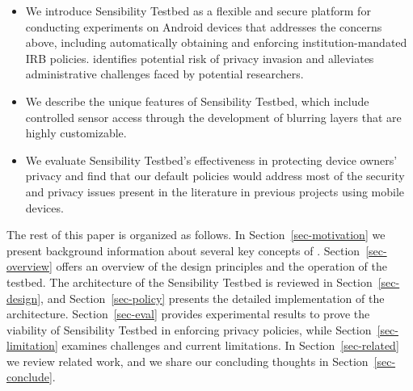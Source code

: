 \begin{itemize}\setlength\itemsep{0em}

\item We introduce Sensibility Testbed as a flexible and secure platform for
conducting experiments on Android devices that addresses the
concerns above, including automatically obtaining and enforcing 
institution-mandated IRB policies. \sysname identifies potential 
risk of privacy invasion and alleviates administrative 
challenges faced by potential researchers.

\item We describe the unique features of Sensibility Testbed, which include 
controlled sensor access through the development of blurring layers that are
highly customizable.

\item We evaluate Sensibility Testbed's effectiveness in
protecting device owners' privacy and find that our default 
policies would address most of the 
security and privacy issues present in the literature in 
previous projects using mobile devices.
\end{itemize}

The rest of this paper is organized as follows. In Section~\ref{sec-motivation} we
present background information about several key concepts of \sysname. 
Section~\ref{sec-overview} offers an overview of the design principles 
and the operation of the testbed. The architecture of the Sensibility Testbed 
is reviewed in Section~\ref{sec-design}, and Section~\ref{sec-policy} 
presents the detailed implementation of the architecture. 
Section~\ref{sec-eval} provides experimental results to prove the
viability of Sensibility Testbed in enforcing privacy policies, while
Section~\ref{sec-limitation} examines challenges and current limitations. 
In Section~\ref{sec-related} we review related work,
and we share our concluding thoughts in Section~\ref{sec-conclude}.

